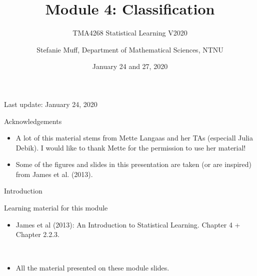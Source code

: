 \documentclass[10pt,ignorenonframetext,]{beamer}
\title{Module 4: Classification}
\subtitle{TMA4268 Statistical Learning V2020}
\author{Stefanie Muff, Department of Mathematical Sciences, NTNU}
\date{January 24 and 27, 2020}
\providecommand{\tightlist}{%
  \setlength{\itemsep}{0pt}\setlength{\parskip}{0pt}}
\begin{document}
\frame{\titlepage}

\begin{frame}

Last update: January 24, 2020

\end{frame}

\begin{frame}{Acknowledgements}

\begin{itemize}
\item
  A lot of this material stems from Mette Langaas and her TAs (especiall
  Julia Debik). I would like to thank Mette for the permission to use
  her material!
\item
  Some of the figures and slides in this presentation are taken (or are
  inspired) from James et al. (2013).
\end{itemize}

\end{frame}

\begin{frame}{Introduction}

\begin{block}{Learning material for this module}

\vspace{2mm}

\begin{itemize}
\tightlist
\item
  James et al (2013): An Introduction to Statistical Learning. Chapter 4
  + Chapter 2.2.3.
\end{itemize}

\(~\)

\begin{itemize}
\tightlist
\item
  All the material presented on these module slides.
\end{itemize}

\end{block}

\end{frame}
\end{document}
